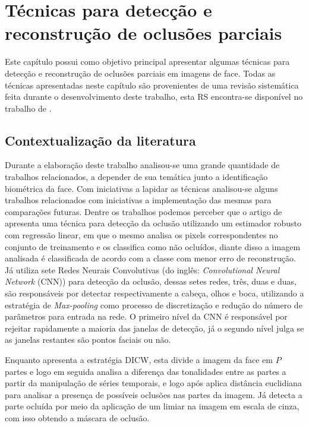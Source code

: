
\chapter{Técnicas para detecção e reconstrução de oclusões parciais}
\label{cp:5_reconstrução}

Este capítulo possui como objetivo principal apresentar algumas técnicas para detecção e reconstrução de oclusões parciais em imagens de face. Todas as técnicas apresentadas neste capítulo são provenientes de uma revisão sistemática feita durante o desenvolvimento deste trabalho, esta RS encontra-se disponível no trabalho de \cite{Targino2018_wvc}. 


\section{Contextualização da literatura}

Durante a elaboração deste trabalho analisou-se uma grande quantidade de trabalhos relacionados, a depender de sua temática junto a identificação biométrica da face. Com iniciativas a lapidar as técnicas analisou-se alguns trabalhos relacionados com iniciativas a implementação das mesmas para comparações futuras. Dentre os trabalhos podemos perceber que o artigo de  apresenta uma técnica para detecção da oclusão utilizando um estimador robusto com regressão linear, em que o mesmo analisa os pixels correspondentes no conjunto de treinamento e os classifica como não ocluídos, diante disso a imagem analisada é classificada de acordo com a classe com menor erro de reconstrução. Já  utiliza sete Redes Neurais Convolutivas (do inglês: \textit{Convolutional Neural Network} (CNN)) para detecção da oclusão, dessas setes redes, três, duas e duas, são responsáveis por detectar respectivamente a cabeça, olhos e boca, utilizando a estratégia de \textit{Max-pooling} como processo de discretização e redução do número de parâmetros para entrada na rede. O primeiro nível da  CNN é  responsável por rejeitar rapidamente a maioria das janelas de detecção, já o segundo nível julga se as janelas restantes são pontos faciais ou não.

Enquanto  apresenta a estratégia DICW, esta divide a imagem da face em $P$ partes e logo em seguida analisa a diferença das tonalidades entre as partes a partir da manipulação de séries temporais, e logo após aplica distância euclidiana para analisar a presença de possíveis oclusões nas partes da imagem. Já  detecta a parte ocluída por meio da aplicação de um limiar na imagem em escala de cinza, com isso obtendo a máscara de oclusão.
 
